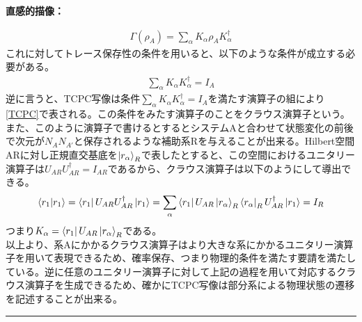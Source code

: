 \documentclass[a4paper,10.5pt]{article}
\numberwithin{equation}{section}
\newenvironment{intuitionbox}
{\begin{prooflabel}\textbf{直感的描像：}\end{prooflabel}\vspace{0.8em}}
{\par\vspace{1em}\hrule\vspace{1em}}
\begin{document}
\begin{intuitionbox}
\begin{equation}\begin{split}
    \Gamma(\rho_{A})=\sum_{\alpha}K_{\alpha}\rho_{A} K_{\alpha}^{\dagger} \label{TCPC}
\end{split} \end{equation}
これに対してトレース保存性の条件を用いると、以下のような条件が成立する必要がある。
\begin{equation}\begin{split}
    \sum_{\alpha}K_{\alpha} K_{\alpha}^{\dagger} = I_{A}
\end{split} \end{equation}
逆に言うと、TCPC写像は条件$\sum_{\alpha}K_{\alpha} K_{\alpha}^{\dagger} = I_{A}$を満たす演算子の組により\eqref{TCPC}で表される。この条件をみたす演算子のことをクラウス演算子という。また、このように演算子で書けるとするとシステムAと合わせて状態変化の前後で次元が$N_{A}N_{A'}$と保存されるような補助系Rを与えることが出来る。Hilbert空間ARに対し正規直交基底を$\ket{r_{\alpha}}_{R}$で表したとすると、この空間におけるユニタリー演算子は$U_{AR}U_{AR}^{\dagger}=I_{AR}$であるから、クラウス演算子は以下のようにして導出できる。
\begin{equation}\begin{split}
    \bra{r_{1}}\ket{r_{1}}=\bra{r_{1}}U_{AR}U_{AR}^{\dagger}\ket{r_{1}}
    =\sum_{\alpha}\bra{r_{1}}U_{AR}\ket{r_{\alpha}}_{R}\bra{r_{\alpha}}_{R}U_{AR}^{\dagger}\ket{r_{1}}
=I_{R} 
\end{split} \end{equation}
つまり$K_{\alpha}=\bra{r_{1}}U_{AR}\ket{r_{\alpha}}_{R}$である。\\
以上より、系Aにかかるクラウス演算子はより大きな系にかかるユニタリー演算子を用いて表現できるため、確率保存、つまり物理的条件を満たす要請を満たしている。逆に任意のユニタリー演算子に対して上記の過程を用いて対応するクラウス演算子を生成できるため、確かにTCPC写像は部分系による物理状態の遷移を記述することが出来る。\\
\end{intuitionbox}
\end{document}
